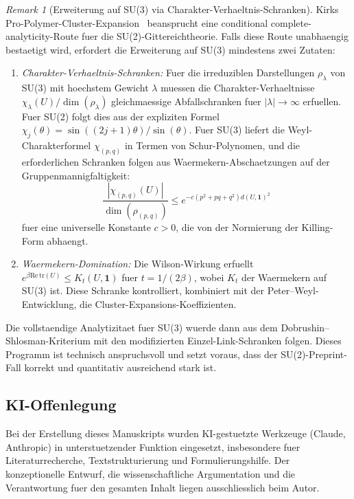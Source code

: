 \documentclass[12pt,a4paper]{article}
\theoremstyle{definition}
\theoremstyle{plain}
\theoremstyle{remark}
\newtheorem{remark}[definition]{Remark}
\begin{document}
\begin{remark}[Erweiterung auf SU(3) via Charakter-Verhaeltnis-Schranken]
\label{rem:su3-extension}
Kirks Pro-Polymer-Cluster-Expansion~\cite{Kirk2026} beansprucht eine conditional complete-analyticity-Route fuer die SU(2)-Gittereichtheorie. Falls diese Route unabhaengig bestaetigt wird, erfordert die Erweiterung auf SU(3) mindestens zwei Zutaten:
\begin{enumerate}
\item \emph{Charakter-Verhaeltnis-Schranken:} Fuer die irreduziblen Darstellungen $\rho_\lambda$ von SU(3) mit hoechstem Gewicht $\lambda$ muessen die Charakter-Verhaeltnisse $\chi_\lambda(U)/\dim(\rho_\lambda)$ gleichmaessige Abfallschranken fuer $|\lambda| \to \infty$ erfuellen. Fuer SU(2) folgt dies aus der expliziten Formel $\chi_j(\theta) = \sin((2j+1)\theta)/\sin(\theta)$. Fuer SU(3) liefert die Weyl-Charakterformel $\chi_{(p,q)}$ in Termen von Schur-Polynomen, und die erforderlichen Schranken folgen aus Waermekern-Abschaetzungen auf der Gruppenmannigfaltigkeit:
\[
\frac{|\chi_{(p,q)}(U)|}{\dim(\rho_{(p,q)})} \leq e^{-c(p^2 + pq + q^2) d(U, \mathbf{1})^2}
\]
fuer eine universelle Konstante $c > 0$, die von der Normierung der Killing-Form abhaengt.
\item \emph{Waermekern-Domination:} Die Wilson-Wirkung erfuellt $e^{\beta \mathrm{Re}\,\mathrm{tr}(U)} \leq K_t(U, \mathbf{1})$ fuer $t = 1/(2\beta)$, wobei $K_t$ der Waermekern auf SU(3) ist. Diese Schranke kontrolliert, kombiniert mit der Peter--Weyl-Entwicklung, die Cluster-Expansions-Koeffizienten.
\end{enumerate}
Die vollstaendige Analytizitaet fuer SU(3) wuerde dann aus dem Dobrushin--Shlosman-Kriterium mit den modifizierten Einzel-Link-Schranken folgen. Dieses Programm ist technisch anspruchsvoll und setzt voraus, dass der SU(2)-Preprint-Fall korrekt und quantitativ ausreichend stark ist.
\end{remark}

\subsection*{KI-Offenlegung}
Bei der Erstellung dieses Manuskripts wurden KI-gestuetzte Werkzeuge (Claude, Anthropic)
in unterstuetzender Funktion eingesetzt, insbesondere fuer Literaturrecherche,
Textstrukturierung und Formulierungshilfe. Der konzeptionelle Entwurf,
die wissenschaftliche Argumentation und die Verantwortung fuer den gesamten Inhalt
liegen ausschliesslich beim Autor.
\end{document}
